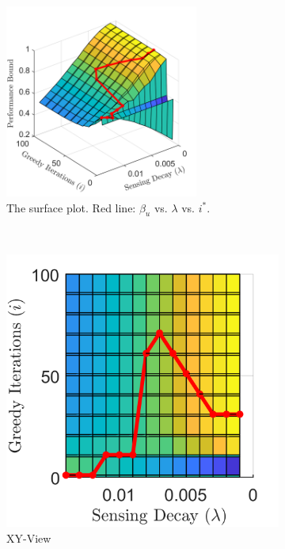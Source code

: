 \documentclass[conference]{IEEEtran}
\begin{document}
\begin{figure}[!h]
    \centering
    \begin{subfigure}[t]{\columnwidth}
        \centering
        \includegraphics[width=2.5in]{Figures/Gen2_Exd1.png}
        \caption{The surface plot. Red line: $\beta_u$ vs. $\lambda$ vs. $i^*$.}
    \end{subfigure}%
    \\ \centering
    \begin{subfigure}[t]{0.17\textwidth}
        \centering
        \includegraphics[width=\textwidth]{Figures/Gen2_Exd2.png}
        \caption{XY-View}
    \end{subfigure}
    \begin{subfigure}[t]{0.17\textwidth}

\end{subfigure}
\end{figure}
\end{document}
